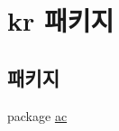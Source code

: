 \hypertarget{namespacekr}{}\section{kr 패키지}
\label{namespacekr}
\subsection*{패키지}
\begin{DoxyCompactItemize}
\item 
package \hyperlink{namespacekr_1_1ac}{ac}
\end{DoxyCompactItemize}
